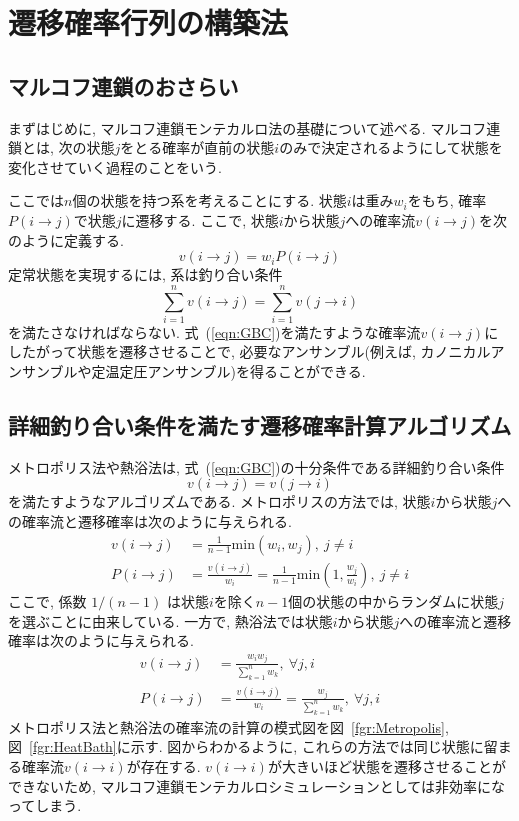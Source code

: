 \section{遷移確率行列の構築法}
\subsection{マルコフ連鎖のおさらい}
まずはじめに, マルコフ連鎖モンテカルロ法の基礎について述べる.
マルコフ連鎖とは, 次の状態$j$をとる確率が直前の状態$i$のみで決定されるようにして状態を変化させていく過程のことをいう.

ここでは$n$個の状態を持つ系を考えることにする. 状態$i$は重み$w_{i}$をもち, 確率$P(i \to j)$で状態$j$に遷移する.
ここで, 状態$i$から状態$j$への確率流$v(i \to j)$を次のように定義する.
\begin{equation}
 v(i \to j) = w_{i} P( i \to j )
 \label{eqn:def_nu}
\end{equation}
定常状態を実現するには, 系は釣り合い条件
\begin{equation}
 \sum_{i=1}^{n} v(i \to j) = \sum_{i=1}^{n} v(j \to i)
 \label{eqn:GBC}
\end{equation}
を満たさなければならない.
式~(\ref{eqn:GBC})を満たすような確率流$v(i \to j)$にしたがって状態を遷移させることで, 必要なアンサンブル(例えば, カノニカルアンサンブルや定温定圧アンサンブル)を得ることができる.

\subsection{詳細釣り合い条件を満たす遷移確率計算アルゴリズム}


メトロポリス法や熱浴法は, 式~(\ref{eqn:GBC})の十分条件である詳細釣り合い条件
\begin{equation}
 v(i \to j) = v(j \to i)
  \label{eqn:DBC}
\end{equation}
を満たすようなアルゴリズムである.
メトロポリスの方法では, 状態$i$から状態$j$への確率流と遷移確率は次のように与えられる.
\begin{align}
 v(i \to j) &= \frac{1}{n-1} \mathrm{min} \left( w_i,w_j \right),~ j \neq i  \label{eqn:nu_MP} \\
 P(i \to j) &= \frac{v(i \to j)}{w_{i}} = \frac{1}{n-1}\mathrm{min}\left(1,\frac{w_{j}}{w_{i}}\right), ~j \neq i \label{eqn:MP_P}
\end{align}
ここで, 係数 $1/(n-1)$ は状態$i$を除く$n-1$個の状態の中からランダムに状態$j$を選ぶことに由来している.
一方で, 熱浴法では状態$i$から状態$j$への確率流と遷移確率は次のように与えられる.
\begin{align}
 v(i \to j) &= \frac{w_{i}w_{j}}{\sum_{k=1}^{n} w_{k}},~ \forall j, i            \label{eqn:nu_HB} \\
 P(i \to j) &= \frac{v(i \to j)}{w_{i}} = \frac{w_{j}}{\sum_{k=1}^{n} w_{k}}, ~ \forall j, i \label{eqn:HB_P}
\end{align}
メトロポリス法と熱浴法の確率流の計算の模式図を図~\ref{fgr:Metropolis}, 図~\ref{fgr:HeatBath}に示す.
図からわかるように, これらの方法では同じ状態に留まる確率流$v(i \to i)$が存在する.
$v(i \to i)$が大きいほど状態を遷移させることができないため, マルコフ連鎖モンテカルロシミュレーションとしては非効率になってしまう.


